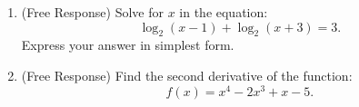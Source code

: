 \documentclass[12pt]{article}
\begin{document}
\begin{enumerate}[label=\textbf{Question \arabic*:}]
  \item (Free Response) Solve for \(x\) in the equation:
    \[
    \log_2(x-1) + \log_2(x+3) = 3.
    \]
    Express your answer in simplest form.
    
  \item (Free Response) Find the second derivative of the function:
    \[
    f(x) = x^4 - 2x^3 + x - 5.
    \]
\end{enumerate}
\end{document}
